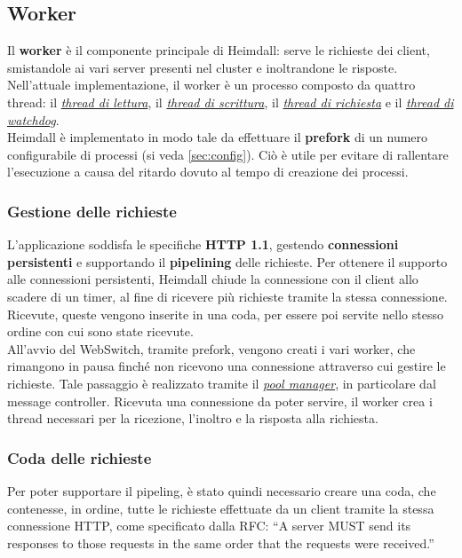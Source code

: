 \documentclass[italian]{tktltiki2}
\begin{document}
\subsection{Worker}
\label{sec:worker}
Il \textbf{worker} è il componente principale di Heimdall: serve le richieste dei client, smistandole ai vari server presenti nel cluster e inoltrandone le risposte.
\\
Nell'attuale implementazione, il worker è un processo composto da quattro thread: il \hyperref[sec:reader]{\emph{thread di lettura}}, il \hyperref[sec:writer]{\emph{thread di scrittura}}, il \hyperref[sec:request]{\emph{thread di richiesta}} e il \hyperref[sec:watchdog]{\emph{thread di watchdog}}.
\\
Heimdall è implementato in modo tale da effettuare il \textbf{prefork} di un numero configurabile di processi (si veda \ref{sec:config}). Ciò è utile per evitare di rallentare l'esecuzione a causa del ritardo dovuto al tempo di creazione dei processi.

\subsubsection{Gestione delle richieste}
\label{sec:requests_management}
L'applicazione soddisfa le specifiche \textbf{HTTP 1.1}\cite{http_1.1}, gestendo \textbf{connessioni persistenti}\cite{persistent_connections} e supportando il \textbf{pipelining}\cite{pipeling} delle richieste. Per ottenere il supporto alle connessioni persistenti, Heimdall chiude la connessione con il client allo scadere di un timer, al fine di ricevere più richieste tramite la stessa connessione. Ricevute, queste vengono inserite in una coda, per essere poi servite nello stesso ordine con cui sono state ricevute.
\\
All'avvio del WebSwitch, tramite prefork, vengono creati i vari worker, che rimangono in pausa finché non ricevono una connessione attraverso cui gestire le richieste. Tale passaggio è realizzato tramite il \hyperref[sec:pool]{\emph{pool manager}}, in particolare dal message controller. Ricevuta una connessione da poter servire, il worker crea i thread necessari per la ricezione, l'inoltro e la risposta alla richiesta.

\subsubsection*{Coda delle richieste}
\label{sec:requests_queue}
Per poter supportare il pipeling, è stato quindi necessario creare una coda, che contenesse, in ordine, tutte le richieste effettuate da un client tramite la stessa connessione HTTP, come specificato dalla RFC: ``A server MUST send its responses to those requests in the same order that the requests were received.''\cite{pipeling}
\end{document}
